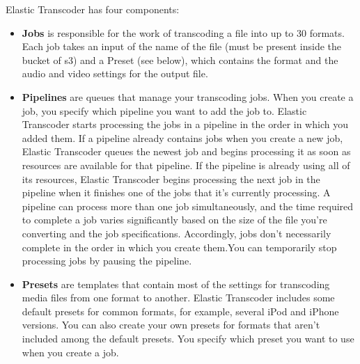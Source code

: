 Elastic Transcoder has four components:
\begin{itemize}



\item \textbf{Jobs} is responsible for the work of transcoding a file into up to 30 formats. Each job takes an input of the name of the file (must be present inside the bucket of s3) and a Preset (see below), which contains the format and the audio and video settings for the output file.


\item \textbf{Pipelines} are queues that manage your transcoding jobs. When you create a job, you specify which pipeline you want to add the job to. Elastic Transcoder starts processing the jobs in a pipeline in the order in which you added them. If a pipeline already contains jobs when you create a new job, Elastic Transcoder queues the newest job and begins processing it as soon as resources are available for that pipeline. If the pipeline is already using all of its resources, Elastic Transcoder begins processing the next job in the pipeline when it finishes one of the jobs that it's currently processing. A pipeline can process more than one job simultaneously, and the time required to complete a job varies significantly based on the size of the file you're converting and the job specifications. Accordingly, jobs don't necessarily complete in the order in which you create them.You can temporarily stop processing jobs by pausing the pipeline.\cite{s3_et}

\item \textbf{Presets} are templates that contain most of the settings for transcoding media files from one format to another. Elastic Transcoder includes some default presets for common formats, for example, several iPod and iPhone versions. You can also create your own presets for formats that aren't included among the default presets. You specify which preset you want to use when you create a job.\cite{s3_et}


\end{itemize}
